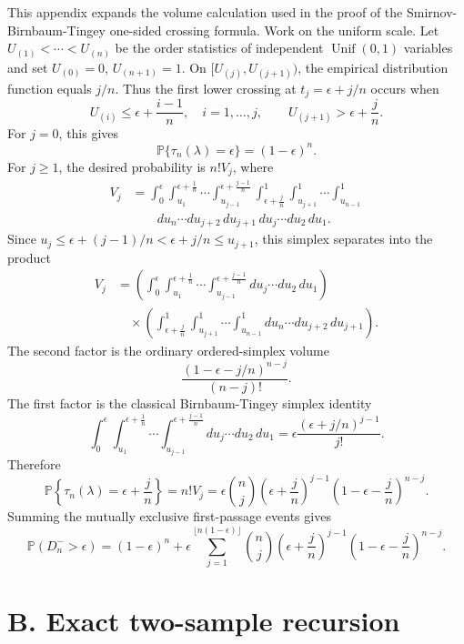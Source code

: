 \documentclass[12pt]{article}
\theoremstyle{remark}
\begin{document}
This appendix expands the volume calculation used in the proof of the
Smirnov-Birnbaum-Tingey one-sided crossing formula. Work on the uniform scale.
Let $U_{(1)}<\cdots<U_{(n)}$ be the order statistics of independent
$\operatorname{Unif}(0,1)$ variables and set $U_{(0)}=0$, $U_{(n+1)}=1$.
On $[U_{(j)},U_{(j+1)})$, the empirical distribution function equals $j/n$.
Thus the first lower crossing at $t_j=\epsilon+j/n$ occurs when
\[
U_{(i)}\le \epsilon+\frac{i-1}{n},\quad i=1,\ldots,j,
\qquad
U_{(j+1)}>\epsilon+\frac{j}{n}.
\]
For $j=0$, this gives
\[
\mathbb{P}\{\tau_n(\lambda)=\epsilon\}=(1-\epsilon)^n.
\]
For $j\ge1$, the desired probability is $n!V_j$, where
\begin{align*}
  V_j
  &=\int_0^\epsilon\int_{u_1}^{\epsilon+\frac{1}{n}}\cdots
    \int_{u_{j-1}}^{\epsilon+\frac{j-1}{n}}
    \int_{\epsilon+\frac{j}{n}}^1\int_{u_{j+1}}^1\cdots
    \int_{u_{n-1}}^1 \\
  &\qquad du_n\cdots du_{j+2}\,du_{j+1}\,du_j\cdots du_2\,du_1 .
\end{align*}
Since $u_j\le\epsilon+(j-1)/n<\epsilon+j/n\le u_{j+1}$, this simplex
separates into the product
\begin{align*}
V_j
&=\left(\int_0^\epsilon\int_{u_1}^{\epsilon+\frac{1}{n}}\cdots
  \int_{u_{j-1}}^{\epsilon+\frac{j-1}{n}}
  du_j\cdots du_2\,du_1\right)\\
&\quad\times
\left(\int_{\epsilon+\frac{j}{n}}^1\int_{u_{j+1}}^1\cdots
  \int_{u_{n-1}}^1
  du_n\cdots du_{j+2}\,du_{j+1} \right).
\end{align*}
The second factor is the ordinary ordered-simplex volume
\[
\frac{(1-\epsilon-j/n)^{n-j}}{(n-j)!}.
\]
The first factor is the classical Birnbaum-Tingey simplex identity
\[
\int_0^\epsilon\int_{u_1}^{\epsilon+\frac{1}{n}}\cdots
    \int_{u_{j-1}}^{\epsilon+\frac{j-1}{n}}
    du_j\cdots du_2\,du_1
    =\epsilon\frac{(\epsilon+j/n)^{j-1}}{j!}.
\]
Therefore
\[
\mathbb{P}\left\{\tau_n(\lambda)=\epsilon+\frac{j}{n}\right\}
=n!V_j
=\epsilon\binom{n}{j}
\left(\epsilon+\frac{j}{n}\right)^{j-1}
\left(1-\epsilon-\frac{j}{n}\right)^{n-j}.
\]
Summing the mutually exclusive first-passage events gives
\[
\mathbb{P}(D_n^->\epsilon)
=(1-\epsilon)^n+\epsilon\sum_{j=1}^{\lfloor n(1-\epsilon)\rfloor}
\binom{n}{j}
\left(\epsilon+\frac{j}{n}\right)^{j-1}
\left(1-\epsilon-\frac{j}{n}\right)^{n-j}.
\]

\section*{B. Exact two-sample recursion}
\end{document}
